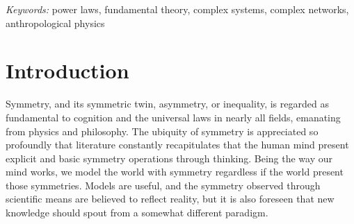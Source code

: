 \documentclass[a4paper, 11pt]{article} %
\begin{document}
%
%

\hspace*{3,6mm}\textit{Keywords:} power laws, fundamental theory, complex systems, complex networks, anthropological physics




\section{Introduction}
Symmetry, and its symmetric twin, asymmetry, or inequality,
is regarded as fundamental to cognition and the universal laws
in nearly all fields, emanating from physics and philosophy.
The ubiquity of symmetry is appreciated so profoundly that
literature constantly recapitulates that the human mind present
explicit and basic symmetry operations through thinking.
Being the way our mind works, we model the world with symmetry
regardless if the world present those symmetries.
Models are useful, and the symmetry observed through scientific
means are believed to reflect reality, but it is also foreseen
that new knowledge should spout from a somewhat different paradigm.
\end{document}
